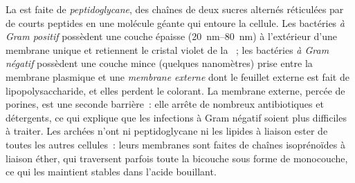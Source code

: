 \begin{proposition}\label{prop:b2:unicellular-diversity:gram}
La  est faite de \emph{peptidoglycane}, des chaînes de
deux sucres alternés réticulées par de courts peptides en une molécule
géante qui entoure la cellule. Les bactéries \emph{à Gram positif}
possèdent une couche épaisse (\qtyrange{20}{80}{nm}) à l'extérieur d'une
membrane unique et retiennent le cristal violet de la ~; les bactéries \emph{à Gram négatif} possèdent une couche mince
(quelques nanomètres) prise entre la membrane plasmique et une
\emph{membrane externe} dont le feuillet externe est fait de
lipopolysaccharide, et elles perdent le colorant. La membrane externe,
percée de porines, est une seconde barrière~: elle arrête de nombreux
antibiotiques et détergents, ce qui explique que les infections à Gram
négatif soient plus difficiles à traiter. Les archées n'ont ni
peptidoglycane ni les lipides à liaison ester de toutes les autres
cellules~: leurs membranes sont faites de chaînes isoprénoïdes à liaison
éther, qui traversent parfois toute la bicouche sous forme de
monocouche, ce qui les maintient stables dans l'acide bouillant.
\end{proposition}

